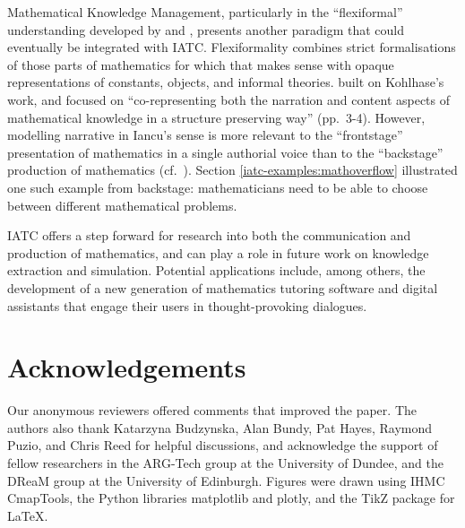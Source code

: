 \documentclass[smallextended,oneside]{svjour3}       %
\newcommand\nothing[1]{#1}
\let\paragraph\nothing
\begin{document}
\paragraph{Mathematical Knowledge Management, particularly in the ``flexiformal'' understanding developed by \citet{kohlhase2012flexiformalist} and \citet{kohlhase2017mathematical}, presents another paradigm that could eventually be integrated with IATC.}
Flexiformality combines strict formalisations of those parts of
mathematics for which that makes sense with opaque representations of
constants, objects, and informal theories.  \citet{iancu-thesis} built
on Kohlhase's work, and focused on ``co-representing both the
narration and content aspects of mathematical knowledge in a structure
preserving way'' (pp.~3-4).  However, modelling narrative in Iancu's
sense is more relevant to the ``frontstage'' presentation of
mathematics in a single authorial voice than to the ``backstage''
production of mathematics (cf.~\citet{hersh1991mathematics}).  Section
\ref{iatc-examples:mathoverflow} illustrated one such example from
backstage: mathematicians need to be able to choose between different
mathematical problems.

\paragraph{IATC offers a step forward for research into both the communication and production of mathematics, and can play a role in future work on knowledge extraction and simulation.}
Potential applications include, among others, the development of a new
generation of mathematics tutoring software and digital assistants
that engage their users in thought-provoking dialogues.

\section{Acknowledgements}
Our anonymous reviewers offered comments that improved the paper.
The authors also thank Katarzyna Budzynska, Alan Bundy, Pat Hayes, Raymond Puzio, and Chris Reed for helpful discussions, and acknowledge the support of fellow researchers in the ARG-Tech group at the University of Dundee, and the DReaM group at the University of Edinburgh.  Figures were drawn using IHMC CmapTools, the Python libraries matplotlib and plotly, and the TikZ package for \LaTeX.

\end{document}
